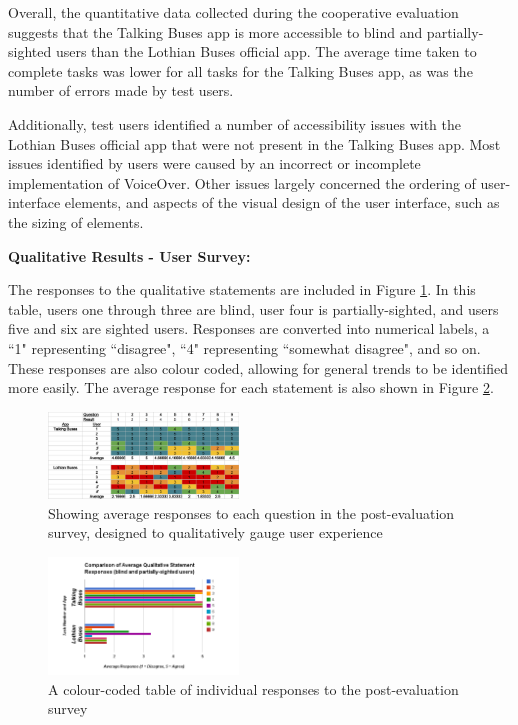 \documentclass[10pt,twocolumn]{article}
\begin{document}
Overall, the quantitative data collected during the cooperative evaluation suggests that the Talking Buses app is more accessible to blind and partially-sighted users than the Lothian Buses official app. The average time taken to complete tasks was lower for all tasks for the Talking Buses app, as was the number of errors made by test users.

Additionally, test users identified a number of accessibility issues with the Lothian Buses official app that were not present in the Talking Buses app. Most issues identified by users were caused by an incorrect or incomplete implementation of VoiceOver. Other issues largely concerned the ordering of user-interface elements, and aspects of the visual design of the user interface, such as the sizing of elements.

\textbf{Qualitative Results - User Survey:}

The responses to the qualitative statements are included in Figure \ref{fig:heatmap}. In this table, users one through three are blind, user four is partially-sighted, and users five and six are sighted users. Responses are converted into numerical labels, a ``1" representing ``disagree", ``4" representing ``somewhat disagree", and so on. These responses are also colour coded, allowing for general trends to be identified more easily. The average response for each statement is also shown in Figure \ref{fig:chart3}.

\begin{figure}[htbp]
\label{heatmap}
  \centering
    \includegraphics[width=0.45\textwidth]{heatmap}
    \caption{Showing average responses to each question in the post-evaluation survey, designed to qualitatively gauge user experience}
    \label{fig:heatmap}
\end{figure}

\begin{figure}[htbp]
  \centering
    \includegraphics[width=0.45\textwidth]{chart_3}
    \caption{A colour-coded table of individual responses to the post-evaluation survey}
    \label{fig:chart3}
\end{figure}
\end{document}
